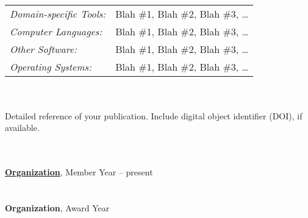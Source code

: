 \documentclass[letterpaper,10pt]{article}
\begin{document}
\hspace{-1.5cm}{\bf COMPUTER SKILLS}	 \vspace{0.1cm}\\
\begin{tabular}{l p{4.95in}}
	\textit{Domain-specific Tools:} &		Blah \#1, Blah \#2, Blah \#3, \dots \\
	\textit{Computer Languages:} &		Blah \#1, Blah \#2, Blah \#3, \dots \\
	\textit{Other Software:} &			Blah \#1, Blah \#2, Blah \#3, \dots \\
	\textit{Operating Systems:} &		Blah \#1, Blah \#2, Blah \#3, \dots \\
\end{tabular}

\vspace{-0.4cm}\hspace{0cm}\\

\hspace{-1.5cm}{\bf PUBLICATIONS}\\
Detailed reference of your publication. Include digital object identifier (DOI), if available.

\vspace{-0.65cm}\hspace{0cm}\\

\hspace{-1.5cm}{\bf PROFESSIONAL AFFILIATIONS AND ACTIVITIES}\\
\href{http://organization.url/}{\bf \color{black} Organization}, Member \hfill Year -- present\\




\vspace{-1.05cm}\hspace{0cm}\\

\hspace{-1.5cm}{\bf AWARDS AND ACHIEVEMENTS}\\
{\bf Organization}, Award \hfill Year\\


\end{document}
